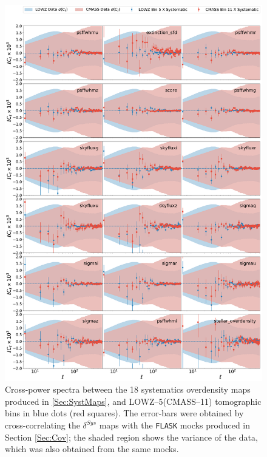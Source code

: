 \begin{figure}
\begin{center}
\includegraphics[width=\textwidth]{BOSS-FIGS/systematics_CMASS_Bin5_LOWZ_Bin5.pdf}
\caption[Cross-power spectra between systematics and LOWZ--5(CMASS--11) tomographic bins.]{Cross-power spectra between the 18 systematics overdensity maps produced in \ref{Sec:SystMaps}, and LOWZ--5(CMASS--11) tomographic bins in blue dots (red squares). The error-bars were obtained by cross-correlating the $\delta^{Sys}$ maps with the \texttt{FLASK} mocks produced in Section \ref{Sec:Cov}; the shaded region shows the variance of the data, which was also obtained from the same mocks.}
\label{fig:SystBin5}
\end{center}
\end{figure}

